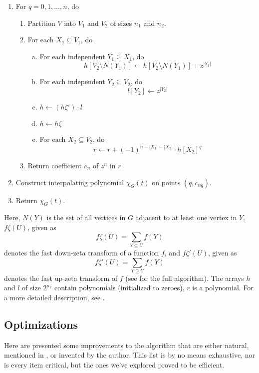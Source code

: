\documentclass[a4paper]{article}
\begin{document}
\begin{enumerate}[{Step} A.]
\item \label{q} For $q = 0, 1, \ldots, n$, do
\begin{enumerate}[1.]
  \item Partition $V$ into $V_1$ and $V_2$ of sizes $n_1$ and $n_2$.
  \item \label{step1} For each $X_1 \subseteq V_1$, do
  \begin{enumerate}[a)]
  \item \label{indep1} For each independent $Y_1 \subseteq X_1$, do
\[ h[V_2 \setminus N(Y_1)] \leftarrow h[V_2 \setminus N(Y_1)] + z^{|Y_1|} \]
  \item \label{indep2} For each independent $Y_2 \subseteq V_2$, do
\[ l[Y_2] \leftarrow z^{|Y_2|} \]
  \item \label{multi} $h \leftarrow (h\zeta')\cdot l$
  \item $h \leftarrow h\zeta$
  \item \label{rstep}For each $X_2 \subseteq V_2$, do
\[ r \leftarrow r + (-1)^{n - |X_1| - |X_2|}\cdot h[X_2]^q \]
  \end{enumerate}
  \item Return coefficient $c_n$ of $z^n$ in $r$.
\end{enumerate}
\item Construct interpolating polynomial $\chi_G(t)$ on points $(q, c_{nq})$.
\item Return $\chi_G(t)$.
\end{enumerate}
Here, $N(Y)$ is the set of all vertices in $G$ adjacent to at least one vertex in $Y$, $f\zeta(U)$, given as
\[f\zeta(U) = \sum_{Y \subseteq U} f(Y)\]
denotes the fast down-zeta transform of a function $f$, and $f\zeta'(U)$, given as 
\[f\zeta'(U) = \sum_{Y \supseteq U} f(Y)\]
denotes the fast up-zeta transform of $f$ (see \cite[sec 2]{cov_pack} for the full algorithm). The arrays $h$ and $l$ of size $2^{n_2}$ contain polynomials (initialized to zeroes), $r$ is a polynomial. For a more detailed description, see \cite[p 9]{cov_pack}.

\subsection{Optimizations}\label{opts}
Here are presented some improvements to the algorithm that are either natural, mentioned in \cite{cov_pack}, or invented by the author. This list is by no means exhaustive, nor is every item critical, but the ones we've explored proved to be efficient. 
\end{document}
